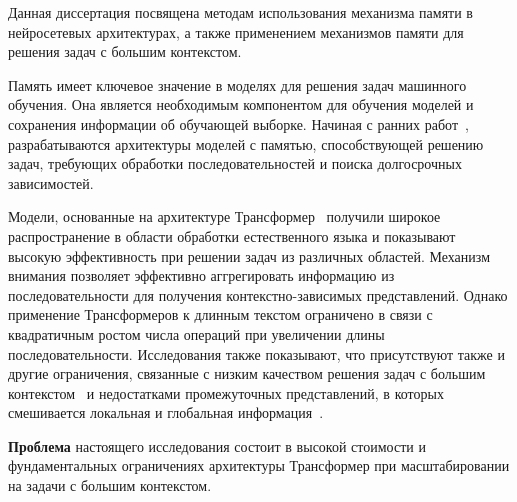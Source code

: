 


Данная диссертация посвящена методам использования механизма памяти в нейросетевых архитектурах, а также применением механизмов памяти для решения задач с большим контекстом.

Память имеет ключевое значение в моделях для решения задач машинного обучения. Она является необходимым компонентом для обучения моделей и сохранения информации об обучающей выборке. Начиная с ранних работ~\cite{hopfield1982neural, elman1990finding, lstm1999hochreiter}, разрабатываются архитектуры моделей с памятью, способствующей решению задач, требующих обработки последовательностей и поиска долгосрочных зависимостей.  

Модели, основанные на архитектуре Трансформер~\cite{vaswani2017attention} получили широкое распространение в области обработки естественного языка и показывают высокую эффективность при решении задач из различных областей. Механизм внимания позволяет эффективно аггрегировать информацию из последовательности для получения контекстно-зависимых представлений. Однако применение Трансформеров к длинным текстом ограничено в связи с квадратичным ростом числа операций при увеличении длины последовательности. Исследования также показывают, что присутствуют также и другие ограничения, связанные с низким качеством решения задач с большим контекстом~\cite{liu2023lost, kuratov2024babilong} и недостатками промежуточных представлений, в которых смешивается локальная и глобальная информация~\cite{burtsev2020memory-transformer}. 

\textbf{Проблема} настоящего исследования состоит в высокой стоимости и фундаментальных ограничениях архитектуры Трансформер при масштабировании на задачи с большим контекстом.


